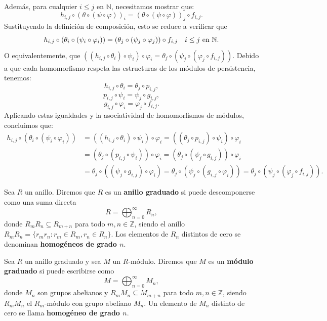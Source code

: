 Además, para cualquier $i \leq j$ en $\mathbb{N}$, necesitamos mostrar que:
\[
h_{i,j}\circ (\theta \circ (\psi \circ \varphi))_{i} = (\theta \circ (\psi \circ
\varphi))_{j} \circ f_{i,j}.
\]
Sustituyendo la definición de composición, esto se reduce a verificar que
\[
h_{i,j}\circ (\theta_{i} \circ (\psi_{i} \circ \varphi_{i})) = (\theta_{j} \circ
(\psi_{j} \circ \varphi_{j})) \circ f_{i,j}\quad i \leq j \text{ en }\mathbb{N}.
\]
O equivalentemente, que $((h_{i,j}\circ \theta_{i}) \circ \psi_{i}) \circ \varphi
_{i} = \theta_{j} \circ (\psi_{j} \circ (\varphi_{j} \circ f_{i,j}))$. Debido a
que cada homomorfismo respeta las estructuras de los módulos de persistencia, tenemos:
\[
h_{i,j}\circ \theta_{i} = \theta_{j} \circ p_{i,j},
\]
\[
p_{i,j}\circ \psi_{i} = \psi_{j} \circ g_{i,j},
\]
\[
g_{i,j}\circ \varphi_{i} = \varphi_{j} \circ f_{i,j}.
\]
Aplicando estas igualdades y la asociatividad de homomorfismos de módulos, concluimos
que:
\begin{align*}
	h_{i,j}\circ (\theta_{i} \circ (\psi_{i} \circ \varphi_{i})) & = ((h_{i,j}\circ \theta_{i}) \circ \psi_{i}) \circ \varphi_{i} = ((\theta_{j} \circ p_{i,j}) \circ \psi_{i}) \circ \varphi_{i}                                                                  \\
	& = (\theta_{j} \circ (p_{i,j}\circ \psi_{i})) \circ \varphi_{i} = (\theta_{j} \circ (\psi_{j} \circ g_{i,j})) \circ \varphi_{i}                                                                  \\
	& = \theta_{j} \circ ((\psi_{j} \circ g_{i,j}) \circ \varphi_{i}) = \theta_{j} \circ (\psi_{j} \circ (g_{i,j}\circ \varphi_{i})) = \theta_{j} \circ (\psi_{j} \circ (\varphi_{j} \circ f_{i,j})).
\end{align*}

\begin{definicion}
	Sea $R$ un anillo. Diremos que $R$ es un \textbf{anillo graduado} si puede descomponerse
	como una suma directa
	\[
	R = \bigoplus_{n=0}^{\infty}R_{n},
	\]
	donde $R_{m} R_{n} \subseteq R_{m+n}$ para todo $m, n \in \mathbb{Z}$, siendo
	el anillo $R_{m} R_{n} = \{ r_{m} r_{n} : r_{m} \in R_{m}, r_{n} \in R_{n} \}$.
	Los elementos de $R_{n}$ distintos de cero se denominan \textbf{homogéneos de
		grado $n$}.
\end{definicion}

\begin{definicion}
	Sea $R$ un anillo graduado y sea $M$ un $R$-módulo. Diremos que $M$ es un
	\textbf{módulo graduado} si puede escribirse como
	\[
	M = \bigoplus_{n=0}^{\infty}M_{n},
	\]
	donde $M_{n}$ son grupos abelianos y $R_{m} M_{n} \subseteq M_{m+n}$ para todo
	$m, n \in \mathbb{Z}$, siendo $R_{m} M_{n}$ el $R_{m}$-módulo con grupo
	abeliano $M_{n}$. Un elemento de $M_{n}$ distinto de cero se llama \textbf{homogéneo
		de grado $n$}.
\end{definicion}


